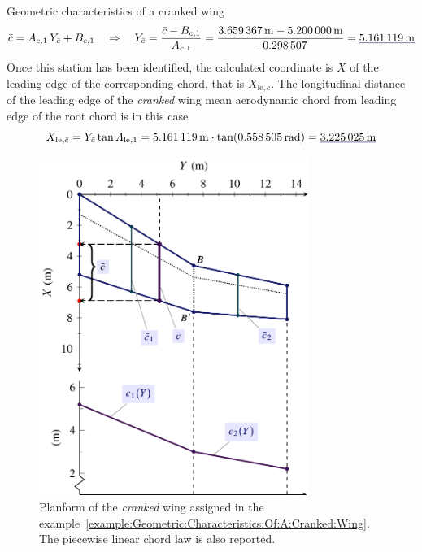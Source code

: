 \documentclass[[12pt,twoside]{book}
\begin{document}
\begin{myExampleX}{Geometric characteristics of a cranked wing}{}
\[
\bar{c}=A_{c,1}\,Y_{\bar{c}} + B_{c,1} \quad \Rightarrow \quad
  Y_{\bar{c}} 
    = \frac{\bar{c} - B_{c,1}}{A_{c,1}}
    = \frac{
      \SI[round-precision=2]{\myMACWingCrankedMT}{\metre} 
        - \SI[round-precision=2]{\myCoeffBChordWingIMT}{\metre}
      }{
        \SI[round-precision=3]{\myCoeffAChordWingI}{}
      }
    = \mathunderline{mydarkblue}{
      \SI[round-precision=2]{\myYYMACWingCrankedMT}{\metre}
    }
\]
Once this station has been identified, the calculated coordinate is $X$ of the leading edge
of the corresponding chord, that is $X_{\mathrm{le},\bar{c}}$.
The longitudinal distance of the leading edge of the \emph{cranked} wing mean aerodynamic chord  from leading edge of the root chord is in this case
\[
X_{\mathrm{le},\bar{c}} 
  = Y_{\bar{c}} \tan \Lambda_{\mathrm{le},1}
  = \SI[round-precision=2]{\myYYMACWingCrankedMT}{\metre}
    \cdot \tan( \SI[round-precision=3]{\mySweepLEWingIRAD}{\radian} )
  = \mathunderline{mydarkblue}{ \SI[round-precision=2]{\myXXMACLEToApexWingCrankedMT}{\metre} }
\]

\begin{figure}[t]%
    \includegraphics[width=0.78\textwidth]{Chapter_2/geometric_characteristics_of_a_cranked_wing/wing_planform_basic_2_drawing.pdf}%
  \caption{
           Planform of the  \emph{cranked} wing assigned in the example~\ref{example:Geometric:Characteristics:Of:A:Cranked:Wing}.
           The piecewise linear chord law is also reported.
  }
  \label{fig:Cranked:Wing:Planform:Results}%
\end{figure}
\end{myExampleX}
\end{document}
